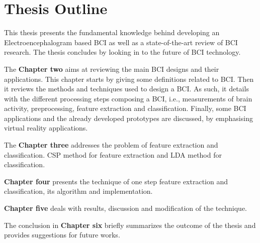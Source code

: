 \section{Thesis Outline}

This thesis presents the fundamental knowledge behind developing an Electroencephalogram based BCI as well as a state-of-the-art review of BCI research. The thesis concludes by looking in to the future of BCI technology.  

The \textbf{Chapter two} aims at reviewing the main BCI designs and their applications. This chapter starts by giving some definitions related to BCI. Then it reviews the methods and techniques used to design a BCI. As such, it details with the different processing steps composing a BCI, i.e., measurements of brain activity, preprocessing, feature extraction and classification. Finally, some BCI applications and the already developed prototypes  are discussed, by emphasising virtual reality applications.

The \textbf{Chapter three} addresses the problem of feature extraction and classification. CSP method for feature extraction and LDA method for classification.

\textbf{Chapter four} presents the technique of one step feature extraction and classification, its algorithm and implementation. 

\textbf{Chapter five} deals with results, discussion and modification of the technique. 

The conclusion in \textbf{Chapter six} briefly summarizes the outcome of the thesis and provides suggestions for future works. 








